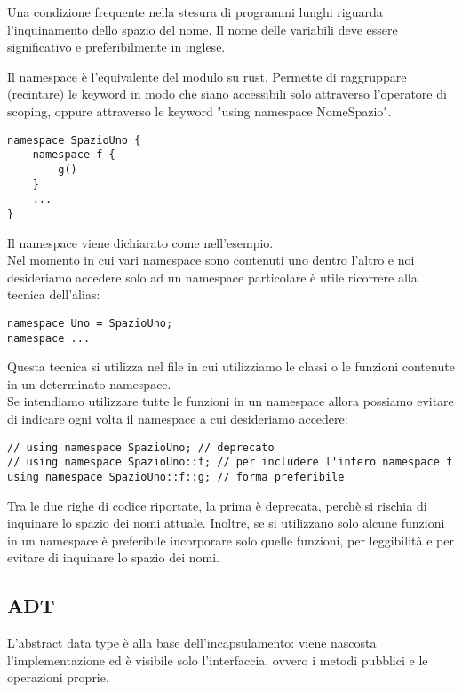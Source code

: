 \documentclass{article}
\begin{document}
Una condizione frequente nella stesura di programmi lunghi riguarda
l'inquinamento dello spazio del nome. Il nome delle variabili deve essere
significativo e preferibilmente in inglese.

Il namespace è l'equivalente del modulo su rust. Permette di raggruppare
(recintare) le keyword in modo che siano accessibili solo attraverso l'operatore
di scoping, oppure attraverso le keyword "using namespace NomeSpazio".

\begin{lstlisting}
namespace SpazioUno {
    namespace f {
        g()
    }
    ...
}
\end{lstlisting}

Il namespace viene dichiarato come nell'esempio.\\
Nel momento in cui vari namespace sono contenuti uno dentro l'altro e noi
desideriamo accedere solo ad un namespace particolare è utile ricorrere alla
tecnica dell'alias:

\begin{lstlisting} 
namespace Uno = SpazioUno;
namespace ...
\end{lstlisting}

Questa tecnica si utilizza nel file in cui utilizziamo le classi o le funzioni
contenute in un determinato namespace.\\
Se intendiamo utilizzare tutte le funzioni in un namespace allora possiamo
evitare di indicare ogni volta il namespace a cui desideriamo accedere:

\begin{lstlisting}
// using namespace SpazioUno; // deprecato
// using namespace SpazioUno::f; // per includere l'intero namespace f
using namespace SpazioUno::f::g; // forma preferibile
\end{lstlisting}

Tra le due righe di codice riportate, la prima è deprecata, perchè si rischia di
inquinare lo spazio dei nomi attuale.
Inoltre, se si utilizzano solo alcune funzioni in un namespace è preferibile
incorporare solo quelle funzioni, per leggibilità e per evitare di inquinare lo
spazio dei nomi.

\subsection{ADT}

L'abstract data type è alla base dell'incapsulamento: viene nascosta
l'implementazione ed è visibile solo l'interfaccia, ovvero i metodi pubblici e
le operazioni proprie.
\end{document}
